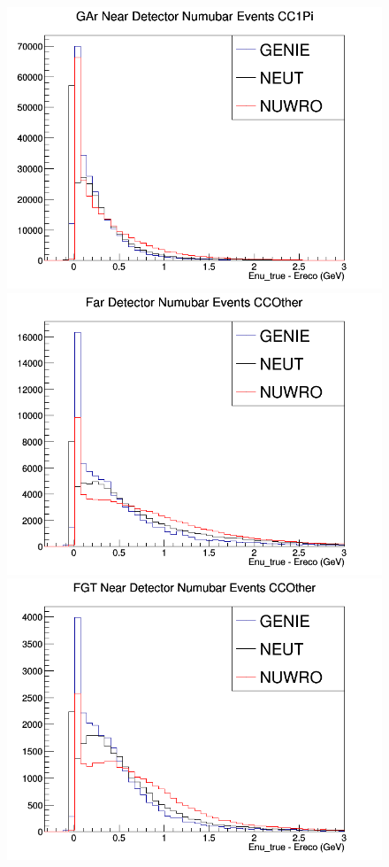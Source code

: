 \documentclass[12pt]{article}
\begin{document}
\begin{figure}[h]
\endminipage
{}
\includegraphics[width=\linewidth]{Ereco_Etrue/numubar_GAr_CC1Pi.png}
\endminipage
\newline
{}
\includegraphics[width=\linewidth]{Ereco_Etrue/numubar_FD_CCOther.png}
\endminipage
{}
\includegraphics[width=\linewidth]{Ereco_Etrue/numubar_FGT_CCOther.png}

\end{figure}
\end{document}
